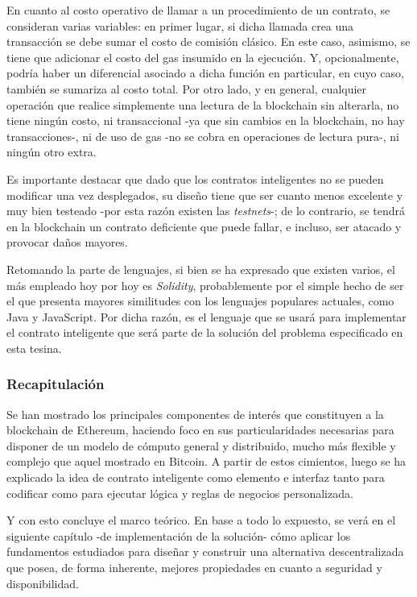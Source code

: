 En cuanto al costo operativo de llamar a un procedimiento de un contrato, se consideran varias variables: en primer lugar, si dicha llamada crea una transacción se debe sumar el costo de comisión clásico. En este caso, asimismo, se tiene que adicionar el costo del gas insumido en la ejecución. Y, opcionalmente, podría haber un diferencial asociado a dicha función en particular, en cuyo caso, también se sumariza al costo total. Por otro lado, y en general, cualquier operación que realice simplemente una lectura de la blockchain sin alterarla, no tiene ningún costo, ni transaccional -ya que sin cambios en la blockchain, no hay transacciones-, ni de uso de gas -no se cobra en operaciones de lectura pura-, ni ningún otro extra.

Es importante destacar que dado que los contratos inteligentes no se pueden modificar una vez desplegados, su diseño tiene que ser cuanto menos excelente y muy bien testeado -por esta razón existen las \textit{testnets}-; de lo contrario, se tendrá en la blockchain un contrato deficiente que puede fallar, e incluso, ser atacado y provocar daños mayores.

Retomando la parte de lenguajes, si bien se ha expresado que existen varios, el más empleado hoy por hoy es \textit{Solidity}, probablemente por el simple hecho de ser el que presenta mayores similitudes con los lenguajes populares actuales, como Java y JavaScript. Por dicha razón, es el lenguaje que se usará para implementar el contrato inteligente que será parte de la solución del problema especificado en esta tesina.

\subsubsection{Recapitulación}

Se han mostrado los principales componentes de interés que constituyen a la blockchain de Ethereum, haciendo foco en sus particularidades necesarias para disponer de un modelo de cómputo general y distribuido, mucho más flexible y complejo que aquel mostrado en Bitcoin. A partir de estos cimientos, luego se ha explicado la idea de contrato inteligente como elemento e interfaz tanto para codificar como para ejecutar lógica y reglas de negocios personalizada.

Y con esto concluye el marco teórico. En base a todo lo expuesto, se verá en el siguiente capítulo -de implementación de la solución- cómo aplicar los fundamentos estudiados para diseñar y construir una alternativa descentralizada que posea, de forma inherente, mejores propiedades en cuanto a seguridad y disponibilidad.

